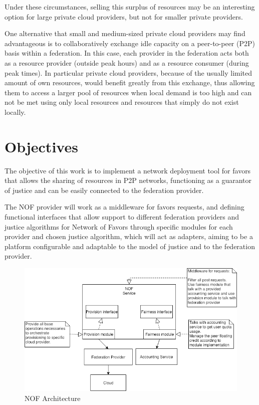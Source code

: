 \documentclass{article}
\begin{document}
Under these circumstances, selling this surplus of resources may be an interesting option for large private cloud providers, but not for smaller private providers.

One alternative that small and medium-sized private cloud providers may find advantageous is to collaboratively exchange idle capacity on a peer-to-peer (P2P) basis within a federation. In this case, each provider in the federation acts both as a resource provider (outside peak hours) and as a resource consumer (during peak times). In particular private cloud providers, because of the usually limited amount of own resources, would benefit greatly from this exchange\cite{fairness-benefices}, thus allowing them to access a larger pool of resources when local demand is too high and can not be met using only local resources and resources that simply do not exist locally.

\section{Objectives}
The objective of this work is to implement a network deployment tool for favors that allows the sharing of resources in P2P networks, functioning as a guarantor of justice and can be easily connected to the federation provider.

The NOF provider will work as a middleware for favors requests, and defining functional interfaces that allow support to different federation providers and justice algorithms for Network of Favors through specific modules for each provider and chosen justice algorithm, which will act as adapters, aiming to be a platform configurable and adaptable to the model of justice and to the federation provider.

\begin{figure}[h!]
    \centering
    \includegraphics[scale=0.4]{./image/NOF-architecture-generic.png}
    \caption{NOF Architecture}
\end{figure}
\end{document}
